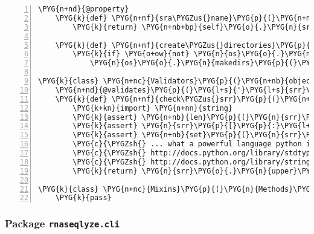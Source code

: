 \begin{Verbatim}[commandchars=\\\{\},numbers=left,firstnumber=1,stepnumber=5]
    \PYG{n+nd}{@property}
    \PYG{k}{def} \PYG{n+nf}{sra\PYGZus{}name}\PYG{p}{(}\PYG{n+nb+bp}{self}\PYG{p}{)}\PYG{p}{:}
        \PYG{k}{return} \PYG{n+nb+bp}{self}\PYG{o}{.}\PYG{n}{srr} \PYG{o}{+} \PYG{l+s}{"}\PYG{l+s}{.sra}\PYG{l+s}{"}

    \PYG{k}{def} \PYG{n+nf}{create\PYGZus{}directories}\PYG{p}{(}\PYG{n+nb+bp}{self}\PYG{p}{)}\PYG{p}{:}
        \PYG{k}{if} \PYG{o+ow}{not} \PYG{n}{os}\PYG{o}{.}\PYG{n}{path}\PYG{o}{.}\PYG{n}{isdir}\PYG{p}{(}\PYG{n+nb+bp}{self}\PYG{o}{.}\PYG{n}{data\PYGZus{}dir}\PYG{p}{)}\PYG{p}{:}
            \PYG{n}{os}\PYG{o}{.}\PYG{n}{makedirs}\PYG{p}{(}\PYG{n+nb+bp}{self}\PYG{o}{.}\PYG{n}{data\PYGZus{}dir}\PYG{p}{)}

\PYG{k}{class} \PYG{n+nc}{Validators}\PYG{p}{(}\PYG{n+nb}{object}\PYG{p}{)}\PYG{p}{:}
    \PYG{n+nd}{@validates}\PYG{p}{(}\PYG{l+s}{'}\PYG{l+s}{srr}\PYG{l+s}{'}\PYG{p}{)}
    \PYG{k}{def} \PYG{n+nf}{check\PYGZus{}srr}\PYG{p}{(}\PYG{n+nb+bp}{self}\PYG{p}{,} \PYG{n}{key}\PYG{p}{,} \PYG{n}{srr}\PYG{p}{)}\PYG{p}{:}
        \PYG{k+kn}{import} \PYG{n+nn}{string}
        \PYG{k}{assert} \PYG{n+nb}{len}\PYG{p}{(}\PYG{n}{srr}\PYG{p}{)} \PYG{o}{==} \PYG{l+m+mi}{9}
        \PYG{k}{assert} \PYG{n}{srr}\PYG{p}{[}\PYG{p}{:}\PYG{l+m+mi}{3}\PYG{p}{]} \PYG{o}{==} \PYG{l+s}{'}\PYG{l+s}{SRR}\PYG{l+s}{'}
        \PYG{k}{assert} \PYG{n+nb}{set}\PYG{p}{(}\PYG{n}{srr}\PYG{p}{[}\PYG{l+m+mi}{3}\PYG{p}{:}\PYG{p}{]}\PYG{p}{)} \PYG{o}{\textless{}} \PYG{n+nb}{set}\PYG{p}{(}\PYG{n}{string}\PYG{o}{.}\PYG{n}{digits}\PYG{p}{)}
        \PYG{c}{\PYGZsh{} ... what a powerful language python is! :-)}
        \PYG{c}{\PYGZsh{} http://docs.python.org/library/stdtypes.html\PYGZsh{}set}
        \PYG{c}{\PYGZsh{} http://docs.python.org/library/string.html\PYGZsh{}string-constants}
        \PYG{k}{return} \PYG{n}{srr}\PYG{o}{.}\PYG{n}{upper}\PYG{p}{(}\PYG{p}{)}

\PYG{k}{class} \PYG{n+nc}{Mixins}\PYG{p}{(}\PYG{n}{Methods}\PYG{p}{,} \PYG{n}{Properties}\PYG{p}{,} \PYG{n}{Validators}\PYG{p}{)}\PYG{p}{:}
    \PYG{k}{pass}
\end{Verbatim}


\subsubsection{Package \texttt{rnaseqlyze.cli}}
\label{rnaseqlyze-pdf:package-rnaseqlyze-cli}

